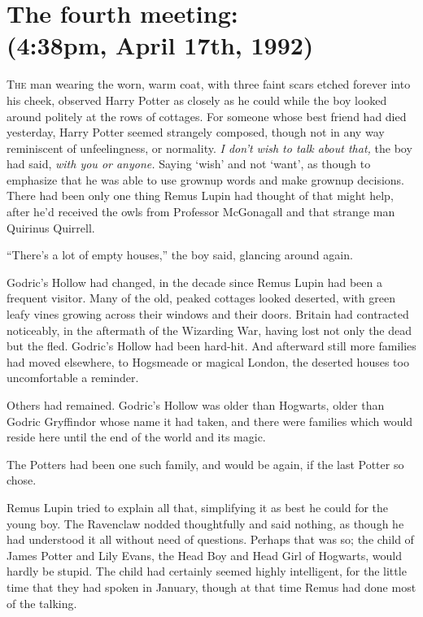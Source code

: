 
\section[The fourth meeting:\\
(4:38pm, April 17th, 1992)]{The fourth meeting:\\
(4:38pm, April 17th, 1992)\protect\footnotemark}


\lettrine{T}{he} man wearing the worn, warm coat, with three faint scars etched forever into
his cheek, observed Harry Potter as closely as he could while the boy looked
around politely at the rows of cottages. For someone whose best friend had died
yesterday, Harry Potter seemed strangely composed, though not in any way
reminiscent of unfeelingness, or normality. \emph{I don’t wish to talk about
that,} the boy had said, \emph{with you or anyone.} Saying ‘wish’ and not
‘want’, as though to emphasize that he was able to use grownup words and make
grownup decisions. There had been only one thing Remus Lupin had thought of
that might help, after he’d received the owls from Professor McGonagall and
that strange man Quirinus Quirrell.

“There’s a lot of empty houses,” the boy said, glancing around again.

Godric’s Hollow had changed, in the decade since Remus Lupin had been a
frequent visitor. Many of the old, peaked cottages looked deserted, with green
leafy vines growing across their windows and their doors. Britain had
contracted noticeably, in the aftermath of the Wizarding War, having lost not
only the dead but the fled. Godric’s Hollow had been hard-hit. And afterward
still more families had moved elsewhere, to Hogsmeade or magical London, the
deserted houses too uncomfortable a reminder.

Others had remained. Godric’s Hollow was older than Hogwarts, older than Godric
Gryffindor whose name it had taken, and there were families which would reside
here until the end of the world and its magic.

The Potters had been one such family, and would be again, if the last Potter so
chose.

Remus Lupin tried to explain all that, simplifying it as best he could for the
young boy. The Ravenclaw nodded thoughtfully and said nothing, as though he had
understood it all without need of questions. Perhaps that was so; the child of
James Potter and Lily Evans, the Head Boy and Head Girl of Hogwarts, would
hardly be stupid. The child had certainly seemed highly intelligent, for the
little time that they had spoken in January, though at that time Remus had done
most of the talking.

